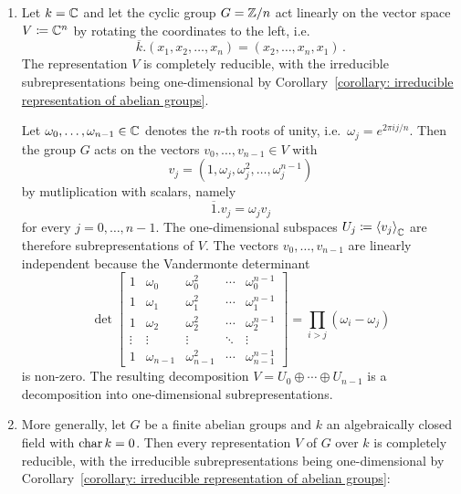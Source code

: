 \begin{example}
  \label{example: complex representations of finite abelian groups are completely reducible}
  \leavevmode
  \begin{enumerate}
    \item
      Let $k = \mathbb{C}$ and let the cyclic group $G = \mathbb{Z}/n$ act linearly on the vector space $V \coloneqq \mathbb{C}^n$ by rotating the coordinates to the left, i.e.
      \[
          \overline{k}.(x_1, x_2, \dotsc, x_n)
        = (x_2, \dotsc, x_n, x_1) \,.
      \]
      The representation $V$ is completely reducible, with the irreducible subrepresentations being one-dimensional by Corollary~\ref{corollary: irreducible representation of abelian groups}.
      
      Let $\omega_0, \dotsc, \omega_{n-1} \in \mathbb{C}$ denotes the $n$-th roots of unity, i.e.\ $\omega_j = e^{2 \pi i j/n}$.
      Then the group $G$ acts on the vectors $v_0, \dotsc, v_{n-1} \in V$ with
      \[
          v_j
        = (1, \omega_j, \omega_j^2, \dotsc, \omega_j^{n-1})
      \]
      by mutliplication with scalars, namely
      \[
          \overline{1}.v_j
        = \omega_j v_j
      \]
      for every $j = 0, \dotsc, n-1$.
      The one-dimensional subspaces $U_j \coloneqq \left\langle  v_j  \right\rangle_{\mathbb{C}}$ are therefore subrepresentations of $V$.
      The vectors $v_0, \dotsc, v_{n-1}$ are linearly independent because the Vandermonte determinant
      \[
          \det
          \begin{bmatrix}
            1       & \omega_0      & \omega_0^2      & \cdots  & \omega_0^{n-1}      \\
            1       & \omega_1      & \omega_1^2      & \cdots  & \omega_1^{n-1}      \\
            1       & \omega_2      & \omega_2^2      & \cdots  & \omega_2^{n-1}      \\
            \vdots  & \vdots        & \vdots          & \ddots  & \vdots              \\
            1       & \omega_{n-1}  & \omega_{n-1}^2  & \cdots  & \omega_{n-1}^{n-1}
          \end{bmatrix}
        = \prod_{i > j} (\omega_i - \omega_j)
      \]
      is non-zero.
      The resulting decomposition $V = U_0 \oplus \dotsb \oplus U_{n-1}$ is a decomposition into one-dimensional subrepresentations.
    \item
      More generally, let $G$ be a finite abelian groups and $k$ an algebraically closed field with $\operatorname{char} k = 0$.
      Then every representation $V$ of $G$ over $k$ is completely reducible, with the irreducible subrepresentations being one-dimensional by Corollary~\ref{corollary: irreducible representation of abelian groups}:
    

\end{enumerate}
\end{example}

